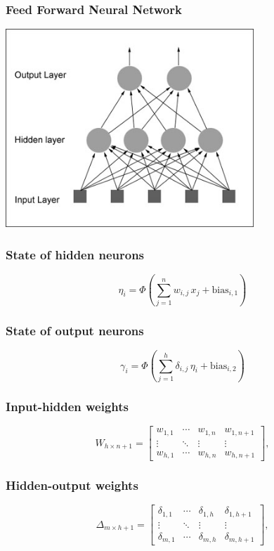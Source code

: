 \begin{frame}
  \frametitle{Feed Forward Neural Network}
  \includegraphics[width=0.7\textwidth]{simple_feedforward_network}
\end{frame}


\begin{frame}
  \frametitle{State of hidden neurons}
  \[
    \eta_{i} =
    \Phi \left(
      \sum_{j=1}^{n}
      w_{i,j}\,x_j + \text{bias}_{i,1}
    \right)
  \]
\end{frame}

\begin{frame}
  \frametitle{State of output neurons}
  \[
    \gamma_{i} =
    \Phi\left(
      \sum_{j=1}^{h}
      \delta_{i,j}\,\eta_i + \text{bias}_{i,2}
    \right)
  \]
\end{frame}

\begin{frame}
  \frametitle{Input-hidden weights}
  \[
    W_{h \times {n+1}} =
    \left[
      \begin{array}{ccc|c}
        w_{1, 1} & \cdots & w_{1, n} & w_{1, n+1} \\
        \vdots   & \ddots & \vdots   & \vdots     \\
        w_{h, 1} & \cdots & w_{h, n} & w_{h, n+1}
      \end{array}
    \right],
  \]
\end{frame}

\begin{frame}
  \frametitle{Hidden-output weights}
  \[
    \Delta_{m \times h+1} =
    \left[
      \begin{array}{ccc|c}
        \delta_{1,1} & \cdots & \delta_{1,h} & \delta_{1,h+1}\\
        \vdots & \ddots &  \vdots & \vdots\\
        \delta_{m,1} & \cdots & \delta_{m,h} &\delta_{m,h+1}
      \end{array}
    \right],
  \]
\end{frame}

